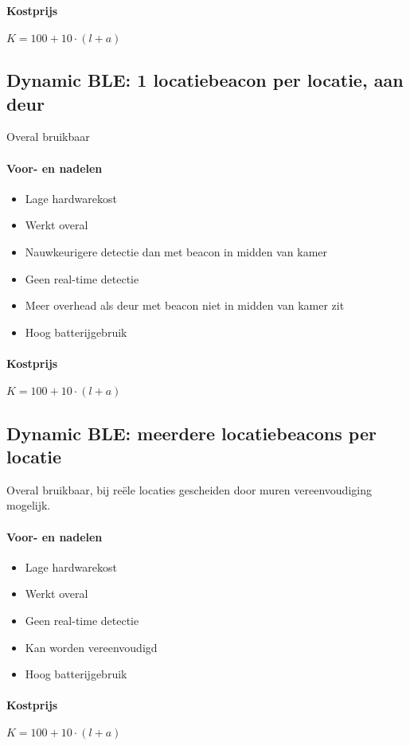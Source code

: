 \paragraph{Kostprijs}
\(K = 100 + 10 \cdot (l + a)\)

\subsection{Dynamic BLE: 1 locatiebeacon per locatie, aan deur}
Overal bruikbaar
\paragraph{Voor- en nadelen}
\begin{itemize}
	\color{ForestGreen}
	\item Lage hardwarekost
	\item Werkt overal
	\item Nauwkeurigere detectie dan met beacon in midden van kamer
	\color{RedOrange}
	\item Geen real-time detectie
	\item Meer overhead als deur met beacon niet in midden van kamer zit
	\item Hoog batterijgebruik
\end{itemize}
\paragraph{Kostprijs}
\(K = 100 + 10 \cdot (l + a)\)

\subsection{Dynamic BLE: meerdere locatiebeacons per locatie}
Overal bruikbaar, bij reële locaties gescheiden door muren vereenvoudiging mogelijk.
\paragraph{Voor- en nadelen}
\begin{itemize}
	\color{ForestGreen}
	\item Lage hardwarekost
	\item Werkt overal
	\color{RedOrange}
	\item Geen real-time detectie
	\item Kan worden vereenvoudigd
	\item Hoog batterijgebruik
\end{itemize}
\paragraph{Kostprijs}
\(K = 100 + 10 \cdot (l + a)\)

